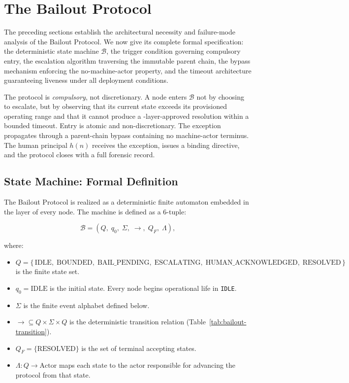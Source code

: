 \section{The Bailout Protocol}\label{sec:bailout}

The preceding sections establish the architectural necessity and failure-mode analysis of the Bailout Protocol. We now give its complete formal specification: the deterministic state machine $\mathcal{B}$, the trigger condition governing compulsory entry, the escalation algorithm traversing the immutable parent chain, the bypass mechanism enforcing the no-machine-actor property, and the timeout architecture guaranteeing liveness under all deployment conditions.

The protocol is \emph{compulsory}, not discretionary. A node enters $\mathcal{B}$ not by choosing to escalate, but by observing that its current state exceeds its provisioned operating range and that it cannot produce a \fact-layer-approved resolution within a bounded timeout. Entry is atomic and non-discretionary. The exception propagates through a parent-chain bypass containing no machine-actor terminus. The human principal $h(n)$ receives the exception, issues a binding directive, and the protocol closes with a full forensic record.

\subsection{State Machine: Formal Definition}\label{sec:state-machine}

The Bailout Protocol is realized as a deterministic finite automaton embedded in the \fact{} layer of every \bxthree{} node. The machine is defined as a 6-tuple:

\[
\mathcal{B} = (Q,\; q_0,\; \Sigma,\; \rightarrow,\; Q_F,\; \Lambda),
\]

where:

\begin{itemize}\itemsep=0pt
\item $Q = \{\,\text{IDLE},\; \text{BOUNDED},\; \text{BAIL\_PENDING},\; \text{ESCALATING},\; \text{HUMAN\_ACKNOWLEDGED},\; \text{RESOLVED}\,\}$ is the finite state set.
\item $q_0 = \text{IDLE}$ is the initial state. Every node begins operational life in \texttt{IDLE}.
\item $\Sigma$ is the finite event alphabet defined below.
\item $\rightarrow \subseteq Q \times \Sigma \times Q$ is the deterministic transition relation (Table~\ref{tab:bailout-transition}).
\item $Q_F = \{\text{RESOLVED}\}$ is the set of terminal accepting states.
\item $\Lambda : Q \rightarrow \text{Actor}$ maps each state to the actor responsible for advancing the protocol from that state.
\end{itemize}

